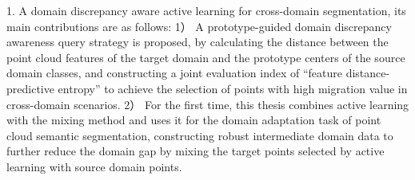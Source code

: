 1. A domain discrepancy aware active learning for cross-domain segmentation, its main contributions are as follows: 
1） A prototype-guided domain discrepancy awareness query strategy is proposed, by calculating the distance between the point cloud features of the target domain and the prototype centers of the source domain classes, and constructing a joint evaluation index of “feature distance-predictive entropy” to achieve the selection of points with high migration value in cross-domain scenarios. 
2） For the first time, this thesis combines active learning with the mixing method and uses it for the domain adaptation task of point cloud semantic segmentation, constructing robust intermediate domain data to further reduce the domain gap by mixing the target points selected by active learning with source domain points.

